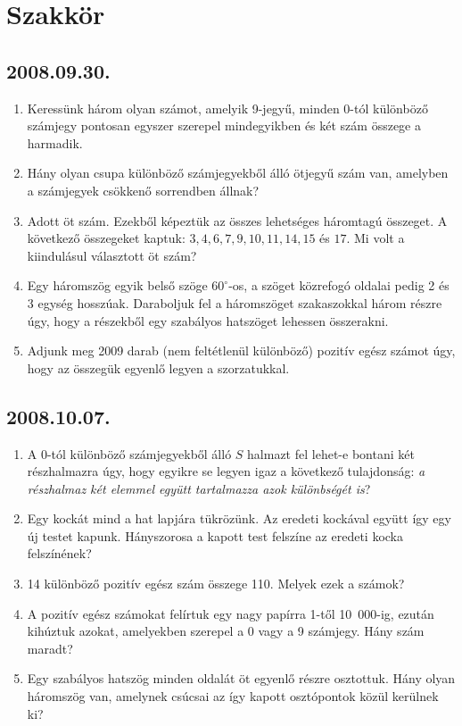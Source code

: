 \documentclass{article}
\begin{document}
\section*{Szakkör}

\subsection*{2008.09.30.}
\begin{enumerate}
\item Keressünk három olyan számot, amelyik 9-jegyű, minden 0-tól különböző számjegy pontosan egyszer szerepel mindegyikben és két szám összege a harmadik.
\item Hány olyan csupa különböző számjegyekből álló ötjegyű szám van, amelyben a 
számjegyek csökkenő sorrendben állnak?
\item Adott öt szám. Ezekből képeztük az összes lehetséges háromtagú összeget. 
A következő összegeket kaptuk: $3,4,6,7,9,10,11,14,15$ és $17$. Mi volt a kiindulásul választott öt szám?
\item Egy háromszög egyik belső szöge $60^\circ$-os, a szöget közrefogó oldalai pedig 2 és 3 egység hosszúak. Daraboljuk fel a háromszöget szakaszokkal három részre úgy, hogy a részekből egy szabályos hatszöget lehessen össze\-rakni.
\item Adjunk meg 2009 darab (nem feltétlenül különböző) pozitív egész számot úgy, 
hogy az összegük egyenlő legyen a szorzatukkal. 
\end{enumerate}

\subsection*{2008.10.07.}
\begin{enumerate}
\item A 0-tól különböző számjegyekből álló $S$ halmazt fel lehet-e bontani két részhalmazra úgy, hogy egyikre se legyen igaz a következő tulajdonság:
\textit{a részhalmaz két elemmel együtt tartalmazza azok különbségét is}?
\item Egy kockát mind a hat lapjára tükrözünk. Az eredeti kockával együtt így egy új testet kapunk. Hányszorosa a kapott test felszíne az eredeti kocka felszínének?
\item 14 különböző pozitív egész szám összege 110. Melyek ezek a számok?
\item A pozitív egész számokat felírtuk egy nagy papírra 1-től 10~000-ig, ezután kihúztuk azokat, amelyekben szerepel a 0 vagy a 9 számjegy. Hány szám maradt?
\item Egy szabályos hatszög minden oldalát öt egyenlő részre osztottuk. Hány olyan 
háromszög van, amelynek csúcsai az így kapott osztópontok közül kerülnek ki?
\end{enumerate}
\end{document}
